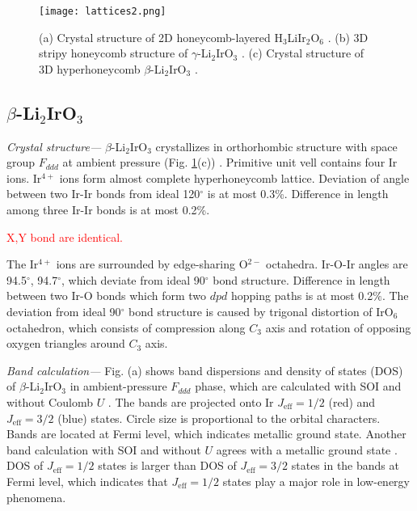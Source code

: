 \begin{figure}
  \centering
  \texttt{[image: lattices2.png]}
  \caption{(a) Crystal structure of 2D honeycomb-layered H$_3$LiIr$_2$O$_6$ \cite{kitagawa2018spin}.
  (b) 3D stripy honeycomb structure of $\gamma$-Li$_2$IrO$_3$ \cite{modic2014realization}.
  (c) Crystal structure of 3D hyperhoneycomb $\beta$-Li$_2$IrO$_3$ \cite{takayama2015hyperhoneycomb}.}
  \label{lattices}
\end{figure}

\subsection{$\beta$-Li$_2$IrO$_3$}
\textit{Crystal structure---} $\beta$-Li$_2$IrO$_3$ crystallizes in orthorhombic structure with space group $F_{ddd}$ at ambient pressure (Fig. \ref{lattices}(c)) \cite{takayama2015hyperhoneycomb}.
Primitive unit vell contains four Ir ions.
Ir$^{4+}$ ions form almost complete hyperhoneycomb lattice.
Deviation of angle between two Ir-Ir bonds from ideal 120$^\circ$ is at most 0.3\%.
Difference in length among three Ir-Ir bonds is at most 0.2\%.

\textcolor{red}{X,Y bond are identical.}

The Ir$^{4+}$ ions are surrounded by edge-sharing O$^{2-}$ octahedra.
Ir-O-Ir angles are 94.5$^\circ$, 94.7$^\circ$, which deviate from ideal 90$^\circ$ bond structure.
Difference in length between two Ir-O bonds which form two $dpd$ hopping paths is at most 0.2$\%$.
The deviation from ideal 90$^\circ$ bond structure is caused by trigonal distortion of IrO$_6$ octahedron, which consists of compression along $C_3$ axis and rotation of opposing oxygen triangles around $C_3$ axis.

\vspace{3mm}
\noindent\textit{Band calculation---} Fig. (a) shows band dispersions and density of states (DOS) of $\beta$-Li$_2$IrO$_3$ in ambient-pressure $F_{ddd}$ phase, which are calculated with SOI and without Coulomb $U$ \cite{}.
The bands are projected onto Ir $J_{\mathrm{eff}} = 1/2$ (red) and $J_{\mathrm{eff}} = 3/2$ (blue) states.
Circle size is proportional to the orbital characters.
Bands are located at Fermi level, which indicates metallic ground state.
Another band calculation with SOI and without $U$ agrees with a metallic ground state \cite{}.
DOS of $J_{\mathrm{eff}} = 1/2$ states is larger than DOS of $J_{\mathrm{eff}} = 3/2$ states in the bands at Fermi level, which indicates that $J_\mathrm{eff} = 1/2$ states play a major role in low-energy phenomena.

